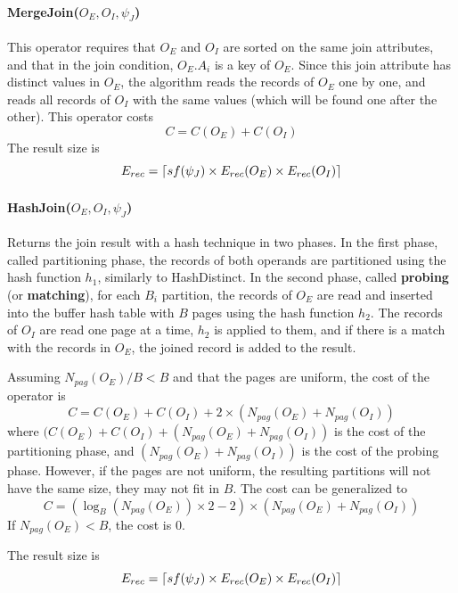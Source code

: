 \paragraph{MergeJoin($O_E, O_I, \psi_J$)}
This operator requires that $O_E$ and $O_I$ are sorted on the same join attributes, and that in the join condition, $O_E.A_i$ is a key of $O_E$. Since this join attribute has distinct values in $O_E$, the algorithm reads the records of $O_E$ one by one, and reads all records of $O_I$ with the same values (which will be found one after the other). This operator costs
\begin{equation*}
    C = C(O_E) + C(O_I)
\end{equation*}
The result size is
\begin{equation*}
    E_{rec} = \left\lceil sf(\psi_J) \times E_{rec}(O_E) \times E_{rec}(O_I)\right\rceil
\end{equation*}

\paragraph{HashJoin($O_E, O_I, \psi_J$)}
Returns the join result with a hash technique in two phases. In the first phase, called partitioning phase, the records of both operands are partitioned using the hash function $h_1$, similarly to HashDistinct. In the second phase, called \textbf{probing} (or \textbf{matching}), for each $B_i$ partition, the records of $O_E$ are read and inserted into the buffer hash table with $B$ pages using the hash function $h_2$. The records of $O_I$ are read one page at a time, $h_2$ is applied to them, and if there is a match with the records in $O_E$, the joined record is added to the result.

Assuming $N_{pag}(O_E)/B < B$ and that the pages are uniform, the cost of the operator is
\begin{equation*}
    C = C(O_E) + C(O_I) + 2 \times (N_{pag}(O_E) + N_{pag}(O_I))
\end{equation*}
where $(C(O_E) + C(O_I) + (N_{pag}(O_E) + N_{pag}(O_I))$ is the cost of the partitioning phase, and $(N_{pag}(O_E) + N_{pag}(O_I))$ is the cost of the probing phase. However, if the pages are not uniform, the resulting partitions will not have the same size, they may not fit in $B$. The cost can be generalized to
\begin{equation*}
    C = (\log_B(N_{pag}(O_E)) \times 2 - 2) \times (N_{pag}(O_E) + N_{pag}(O_I))
\end{equation*}
If $N_{pag}(O_E) < B$, the cost is 0.

The result size is
\begin{equation*}
    E_{rec} = \left\lceil sf(\psi_J) \times E_{rec}(O_E) \times E_{rec}(O_I)\right\rceil
\end{equation*}